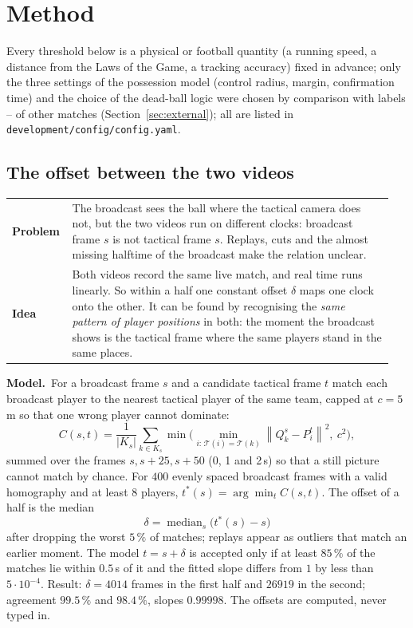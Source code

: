 \documentclass[11pt,a4paper]{article}
\makeatletter
\newcommand{\triple}[3]{%
  \par\medskip\noindent
  \begin{tabular}{@{}p{0.13\linewidth}@{\hspace{0.6em}}p{0.82\linewidth}@{}}
  \textbf{Problem} & #1\\[0.3em]
  \textbf{Idea}    & #2
  \end{tabular}\par\smallskip\noindent
  \textbf{Model.}\ #3\par\medskip}
\newcommand{\norm}[1]{\left\lVert #1 \right\rVert}
\newcommand{\Team}{\mathcal{T}}
\makeatother
\begin{document}
\section{Method}\label{sec:method}

Every threshold below is a physical or football quantity (a running speed, a distance from
the Laws of the Game, a tracking accuracy) fixed in advance; only the three settings of the possession model (control radius, margin,
confirmation time) and the choice of the dead-ball logic were chosen by comparison with labels
-- of other matches (Section~\ref{sec:external}); all are listed in \texttt{development/config/config.yaml}.

\subsection{The offset between the two videos}\label{sec:offset}

\triple{The broadcast sees the ball where the tactical camera does not, but the two videos
run on different clocks: broadcast frame $s$ is not tactical frame $s$. Replays, cuts and the
almost missing halftime of the broadcast make the relation unclear.}
{Both videos record the same live match, and real time runs linearly. So within a half one
constant offset $\delta$ maps one clock onto the other. It can be found by recognising the
\emph{same pattern of player positions} in both: the moment the broadcast shows is the
tactical frame where the same players stand in the same places.}
{For a broadcast frame $s$ and a candidate tactical frame $t$ match each broadcast player to
the nearest tactical player of the same team, capped at $c=5$\,m so that one wrong player
cannot dominate:
\begin{equation}
 C(s,t)=\frac1{|K_s|}\sum_{k\in K_s}\min\Big(\min_{i:\,\Team(i)=\Team(k)}\norm{Q_k^s-P_i^t}^2,\ c^2\Big),
\end{equation}
summed over the frames $s,s+25,s+50$ (0, 1 and 2\,s) so that a still picture cannot match by
chance. For $400$ evenly spaced broadcast frames with a valid homography and at least $8$
players, $t^\ast(s)=\arg\min_t C(s,t)$. The offset of a half is the median
\begin{equation}
  \delta=\operatorname{median}_s\big(t^\ast(s)-s\big)
\end{equation}
after dropping the worst $5\,\%$ of matches; replays appear as outliers that match an
earlier moment. The model $t=s+\delta$ is accepted only if at least $85\,\%$ of the matches
lie within $0.5$\,s of it and the fitted slope differs from $1$ by less than $5\cdot10^{-4}$.
Result: $\delta=4014$ frames in the first half and $26919$ in the second; agreement
$99.5\,\%$ and $98.4\,\%$, slopes $0.99998$. The offsets are computed, never typed in.}
\end{document}
